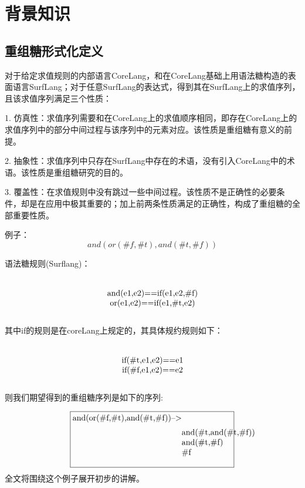 \pagestyle{fancy}
\normalsize
\linespread{1.5}\selectfont
\chapter{背景知识}

\section{重组糖形式化定义}
对于给定求值规则的内部语言CoreLang，和在CoreLang基础上用语法糖构造的表面语言SurfLang；对于任意SurfLang的表达式，得到其在SurfLang上的求值序列，且该求值序列满足三个性质：

1.	仿真性：求值序列需要和在CoreLang上的求值顺序相同，即存在CoreLang上的求值序列中的部分中间过程与该序列中的元素对应。该性质是重组糖有意义的前提。

2.	抽象性：求值序列中只存在SurfLang中存在的术语，没有引入CoreLang中的术语。该性质是重组糖研究的目的。

3.	覆盖性：在求值规则中没有跳过一些中间过程。该性质不是正确性的必要条件，却是在应用中极其重要的；加上前两条性质满足的正确性，构成了重组糖的全部重要性质。

例子：
\begin{equation}
and(or(\#f,\#t),and(\#t,\#f))
\end{equation}

语法糖规则(Surflang)：
\begin{equation}
\parbox[t]{\textwidth}{%
	\begin{center}  
	and(e1,e2)==if(e1,e2,\#f)\\
	or(e1,e2)==if(e1,\#t,e2)
	\end{center}  
}%
\end{equation}


其中if的规则是在coreLang上规定的，其具体规约规则如下：
\begin{equation}
\parbox[t]{\textwidth}{%
	\begin{center}  
	if(\#t,e1,e2)==e1\\
	if(\#f,e1,e2)==e2
	\end{center}  
}%
\end{equation}

则我们期望得到的重组糖序列是如下的序列:

\begin{equation}
\framebox[20em][l]{%
	and(or(\#f,\#t),and(\#t,\#f))-->\parbox[t]{\textwidth}{%
		\begin{flushleft}  
			and(\#t,and(\#t,\#f))\\
			and(\#t,\#f)\\
			\#f
		\end{flushleft}  
	}%
}  
\end{equation}
全文将围绕这个例子展开初步的讲解。

